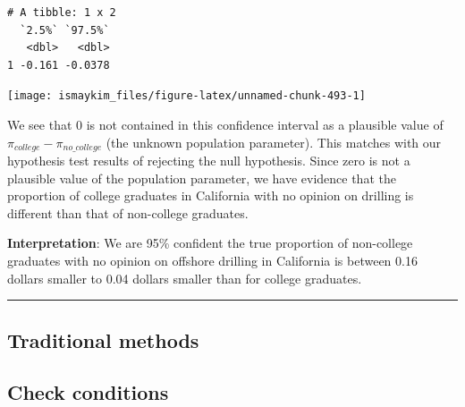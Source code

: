 \documentclass[12pt,]{krantz}
\makeatletter
\newenvironment{Shaded}{\begin{snugshade}}{\end{snugshade}}
\newcommand{\KeywordTok}[1]{\textcolor[rgb]{0.27,0.27,0.27}{\textbf{#1}}}
\newcommand{\DataTypeTok}[1]{\textcolor[rgb]{0.27,0.27,0.27}{#1}}
\newcommand{\StringTok}[1]{\textcolor[rgb]{0.5,0.5,0.5}{#1}}
\newcommand{\OperatorTok}[1]{\textcolor[rgb]{0.43,0.43,0.43}{\textbf{#1}}}
\newcommand{\NormalTok}[1]{#1}
\newenvironment{kframe}{%
\medskip{}
\setlength{\fboxsep}{.8em}
 \def\at@end@of@kframe{}%
 \ifinner\ifhmode%
  \def\at@end@of@kframe{\end{minipage}}%
  \begin{minipage}{\columnwidth}%
 \fi\fi%
 \def\FrameCommand##1{\hskip\@totalleftmargin \hskip-\fboxsep
 \colorbox{shadecolor}{##1}\hskip-\fboxsep
     \hskip-\linewidth \hskip-\@totalleftmargin \hskip\columnwidth}%
 \MakeFramed {\advance\hsize-\width
   \@totalleftmargin\z@ \linewidth\hsize
   \@setminipage}}%
 {\par\unskip\endMakeFramed%
 \at@end@of@kframe}
\renewenvironment{Shaded}{\begin{kframe}}{\end{kframe}}
\makeatother
\begin{document}
\begin{Shaded}
\end{Shaded}

\begin{verbatim}
# A tibble: 1 x 2
  `2.5%` `97.5%`
   <dbl>   <dbl>
1 -0.161 -0.0378
\end{verbatim}

\begin{Shaded}
\end{Shaded}

\begin{center}\texttt{[image: ismaykim\_files/figure-latex/unnamed-chunk-493-1]} \end{center}

We see that 0 is not contained in this confidence interval as a
plausible value of \(\pi_{college} - \pi_{no\_college}\) (the unknown
population parameter). This matches with our hypothesis test results of
rejecting the null hypothesis. Since zero is not a plausible value of
the population parameter, we have evidence that the proportion of
college graduates in California with no opinion on drilling is different
than that of non-college graduates.

\textbf{Interpretation}: We are 95\% confident the true proportion of
non-college graduates with no opinion on offshore drilling in California
is between 0.16 dollars smaller to 0.04 dollars smaller than for college
graduates.

\begin{center}\rule{0.5\linewidth}{\linethickness}\end{center}

\subsection{Traditional methods}\label{traditional-methods-2}

\subsection{Check conditions}\label{check-conditions-2}
\end{document}
